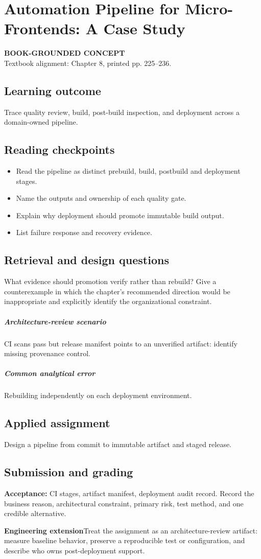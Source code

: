 \documentclass[11pt,letterpaper,oneside]{report}
\newcommand{\based}[1]{\begin{sourcebox}\textbf{BOOK-GROUNDED CONCEPT}\\#1\end{sourcebox}}
\newcommand{\criterion}[1]{\textbf{Acceptance:} #1}
\begin{document}
\chapter{Automation Pipeline for Micro-Frontends: A Case Study}
\based{Textbook alignment: Chapter 8, printed pp. 225--236.}
\section{Learning outcome}
Trace quality review, build, post-build inspection, and deployment across a domain-owned pipeline.
\section{Reading checkpoints}
\begin{itemize}\item Read the pipeline as distinct prebuild, build, postbuild and deployment stages.
\item Name the outputs and ownership of each quality gate.
\item Explain why deployment should promote immutable build output.
\item List failure response and recovery evidence.
\end{itemize}
\section{Retrieval and design questions}
What evidence should promotion verify rather than rebuild? Give a counterexample in which the chapter's recommended direction would be inappropriate and explicitly identify the organizational constraint.
\paragraph{Architecture-review scenario} CI scans pass but release manifest points to an unverified artifact: identify missing provenance control.
\paragraph{Common analytical error} Rebuilding independently on each deployment environment.
\section{Applied assignment}
Design a pipeline from commit to immutable artifact and staged release.
\section{Submission and grading}
\criterion{CI stages, artifact manifest, deployment audit record. Record the business reason, architectural constraint, primary risk, test method, and one credible alternative.}
\begin{engineerbox}\textbf{Engineering extension}\newline Treat the assignment as an architecture-review artifact: measure baseline behavior, preserve a reproducible test or configuration, and describe who owns post-deployment support.\end{engineerbox}
\end{document}

